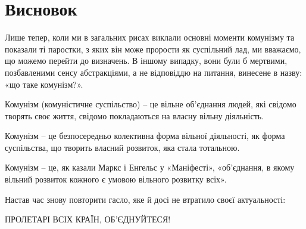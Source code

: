 \documentclass[../main]{subfiles}
\begin{document}
\ifSubfilesClassLoaded{\setcounter{page}{62}}{}
\section{Висновок}
\label{sec:11_zaklyuchenie}

Лише тепер, коли ми в загальних рисах виклали основні моменти комунізму та показали ті паростки, з яких він може прорости як суспільний лад, ми вважаємо, що можемо перейти до визначень. В іншому випадку, вони були б мертвими, позбавленими сенсу абстракціями, а не відповіддю на питання, винесене в назву: «що таке комунізм?».

Комунізм (комуністичне суспільство) – це вільне об’єднання людей, які свідомо творять своє життя, свідомо покладаються на власну вільну діяльність.

Комунізм – це безпосередньо колективна форма вільної діяльності, як форма суспільства, що творить власний розвиток, яка стала тотальною.

Комунізм – це, як казали Маркс і Енгельс у «Маніфесті», «об’єднання, в якому вільний розвиток кожного є умовою вільного розвитку всіх».

Настав час знову повторити гасло, яке й досі не втратило своєї актуальності:

ПРОЛЕТАРІ ВСІХ КРАЇН, ОБ’ЄДНУЙТЕСЯ!
\end{document}
